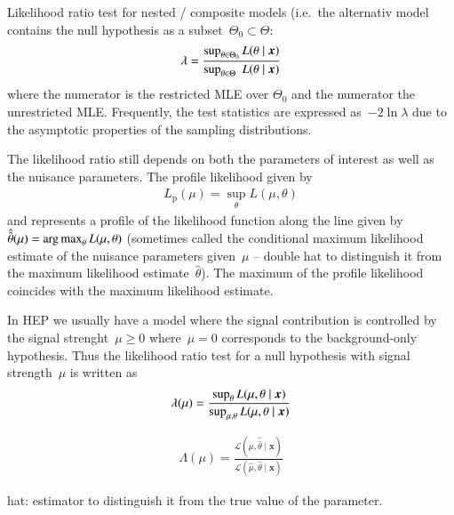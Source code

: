 
Likelihood ratio test for nested / composite models (i.e.\ the
alternativ model contains the null hypothesis as a
subset~$\Theta_0 \subset \Theta$:
\begin{align}
  \lambda = \frac{\sup_{\theta \in \Theta_0} L(\theta \mid \boldx)}{\sup_{\theta \in \Theta\phantom{_0}} L(\theta \mid \boldx)}
\end{align}
where the numerator is the restricted MLE over $\Theta_0$ and the
numerator the unrestricted MLE. Frequently, the test statistics are
expressed as~$-2 \ln \lambda$ due to the asymptotic properties of the
sampling distributions.

The likelihood ratio still depends on both the parameters of interest
as well as the nuisance parameters. The profile likelihood given by
\begin{align*}
  L_\text{p}(\mu) = \sup_\theta L(\mu, \theta) %
\end{align*}
and represents a profile of the likelihood function along the line
given by~$\hat{\hat{\theta}}(\mu) = \operatorname*{arg\,max}_\theta L(\mu, \theta)$
(sometimes called the conditional maximum likelihood estimate of the
nuisance parameters given~$\mu$ -- double hat to distinguish it from
the maximum likelihood estimate~$\hat{\theta}$). The maximum of the
profile likelihood coincides with the maximum likelihood estimate.


In HEP we usually have a model where the signal contribution is
controlled by the signal strenght~$\mu \geq 0$ where~$\mu = 0$
corresponds to the background-only hypothesis. Thus the likelihood
ratio test for a null hypothesis with signal strength~$\mu$ is written as
\begin{align}
  \lambda(\mu) = \frac{\sup_\theta L(\mu, \theta \mid \boldx)}{\sup_{\mu,\theta} L(\mu, \theta \mid \boldx)}
\end{align}


\begin{align*}
  \Lambda(\mu) = \frac{\mathcal{L}\left( \mu, \hat{\hat{\theta}} \mid \mathbf{x} \right)}
                      {\mathcal{L}\left( \hat{\mu}, \hat{\theta} \mid \mathbf{x} \right)}
\end{align*}


hat: estimator to distinguish it from the true value of the parameter.

